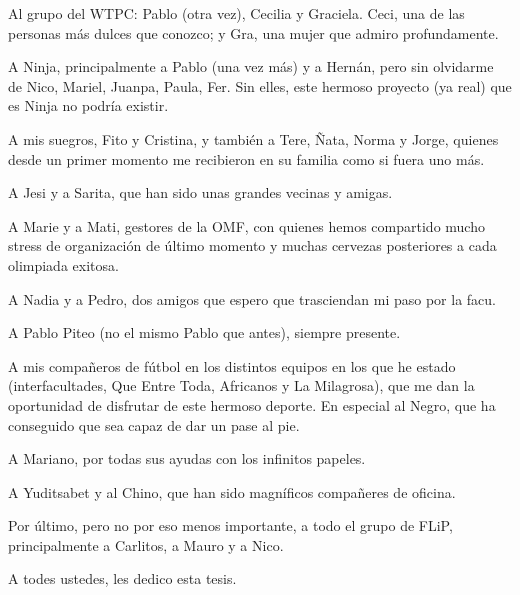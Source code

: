 Al grupo del WTPC: Pablo (otra vez), Cecilia y Graciela. Ceci, una de
las personas más dulces que conozco; y Gra, una mujer que admiro
profundamente.

A Ninja, principalmente a Pablo (una vez más) y a Hernán, pero sin
olvidarme de Nico, Mariel, Juanpa, Paula, Fer. Sin elles, este
hermoso proyecto (ya real) que es Ninja no podría existir.

A mis suegros, Fito y Cristina, y también a Tere, Ñata, Norma y Jorge,
quienes desde un primer momento me recibieron en su familia como si
fuera uno más.

A Jesi y a Sarita, que han sido unas grandes vecinas y amigas.

A Marie y a Mati, gestores de la OMF, con quienes hemos compartido
mucho stress de organización de último momento y muchas cervezas
posteriores a cada olimpiada exitosa.

A Nadia y a Pedro, dos amigos que espero que trasciendan mi paso por
la facu.

A Pablo Piteo (no el mismo Pablo que antes), siempre presente.

A mis compañeros de fútbol en los distintos equipos en los que he
estado (interfacultades, Que Entre Toda, Africanos y La Milagrosa),
que me dan la oportunidad de disfrutar de este hermoso deporte. En
especial al Negro, que ha conseguido que sea capaz de dar un pase al
pie.

A Mariano, por todas sus ayudas con los infinitos papeles.

A Yuditsabet y al Chino, que han sido magníficos compañeres de
oficina.

Por último, pero no por eso menos importante, a todo el grupo de FLiP,
principalmente a Carlitos, a Mauro y a Nico.

A todes ustedes, les dedico esta tesis.
